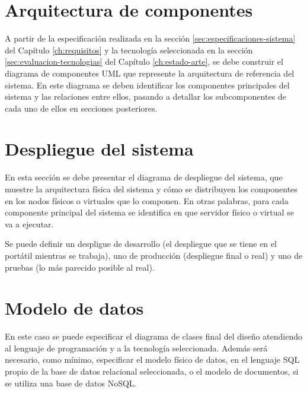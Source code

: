 

\section{Arquitectura de componentes}

A partir de la especificación realizada en la sección \ref{sec:especificaciones-sistema} del Capítulo \ref{ch:requisitos} y la tecnología seleccionada en la sección \ref{sec:evaluacion-tecnologias} del Capítulo \ref{ch:estado-arte}, se debe construir el diagrama de componentes UML que represente la arquitectura de referencia del sistema. 
En este diagrama se deben identificar los componentes principales del sistema y las relaciones entre ellos, pasando a detallar los subcomponentes de cada uno de ellos en secciones posteriores.

\section{Despliegue del sistema}

En esta sección se debe presentar el diagrama de despliegue del sistema, que muestre la arquitectura física del sistema y cómo se distribuyen los componentes en los nodos físicos o virtuales que lo componen.
En otras palabras, para cada componente principal del sistema se identifica en que servidor físico o virtual se va a ejecutar.

Se puede definir un despligue de desarrollo (el despliegue que se tiene en el portátil mientras se trabaja), uno de producción (despliegue final o real) y uno de pruebas (lo más parecido posible al real).

\section{Modelo de datos}

En este caso se puede especificar el diagrama de clases final del diseño atendiendo al lenguaje de programación y a la tecnología seleccionada.
Además será necesario, como mínimo, especificar el modelo físico de datos, en el lenguaje SQL propio de la base de datos relacional seleccionada, o el modelo de documentos, si se utiliza una base de datos NoSQL. 
